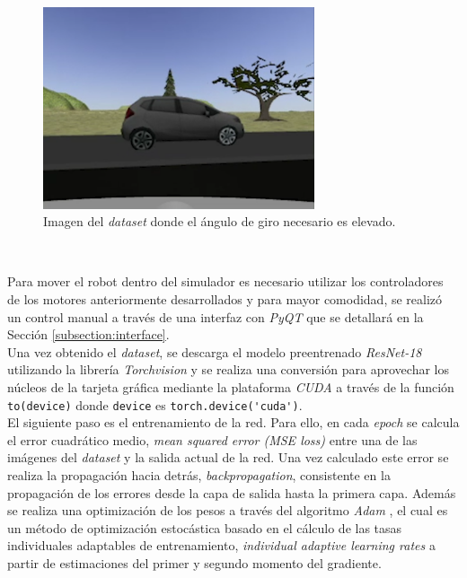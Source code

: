 \begin{figure} [h!]
	\begin{center}
		\includegraphics[width=8cm]{figs/trainedDifficult}
	\end{center}
	\caption{Imagen del \textit{dataset} donde el ángulo de giro necesario es elevado.}
	\label{fig:traineddifficult}
\end{figure}\

Para mover el robot dentro del simulador es necesario utilizar los controladores de los motores anteriormente desarrollados y para mayor comodidad, se realizó un control manual a través de una interfaz con \textit{PyQT} que se detallará en la Sección \ref{subsection:interface}.\\

Una vez obtenido el \textit{dataset}, se descarga el modelo preentrenado \textit{ResNet-18} utilizando la librería \textit{Torchvision} y se realiza una conversión para aprovechar los núcleos de la tarjeta gráfica mediante la plataforma \textit{CUDA} a través de la función \verb|to(device)| donde \verb|device| es \verb|torch.device('cuda')|.\\ 

El siguiente paso es el entrenamiento de la red. Para ello, en cada \textit{epoch} se calcula el error cuadrático medio, \textit{mean squared error (MSE loss)} entre una de las imágenes del \textit{dataset} y la salida actual de la red. Una vez calculado este error se realiza la propagación hacia detrás, \textit{backpropagation}, consistente en la propagación de los errores desde la capa de salida hasta la primera capa. Además se realiza una optimización de los pesos a través del algoritmo \textit{Adam} \cite{adam}, el cual es un método de optimización estocástica basado en el cálculo de las tasas individuales adaptables de entrenamiento, \textit{individual adaptive learning rates} a partir de estimaciones del primer y segundo momento del gradiente.\\

